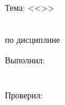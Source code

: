 \begin{ESKDtitlePage}
    \begin{center}
        \gpiMinEduRep \\
        \gpiEduRep \\
        \gpiKafRep \\
    \end{center}

    \vfill

    \begin{center}
        Тема: <<\gpiTopicRep>>
    \end{center}

    \vfill

    \begin{center}
        \textbf{\gpiDocTopic} \\
        по дисциплине \gpiDisciplineRep \\
    \end{center}

    \vfill

    \begin{flushright}
        \begin{minipage}[t]{7cm}
            Выполнил: \\
            \PageTitleStudentInfo \\
            \hspace{0pt} \\
            Проверил: \\
            \PageTitleTeacherInfo \\
        \end{minipage}
    \end{flushright}

    \vfill

    \begin{center}
        \PageTitleCity~\ESKDtheYear
    \end{center}
\end{ESKDtitlePage}
